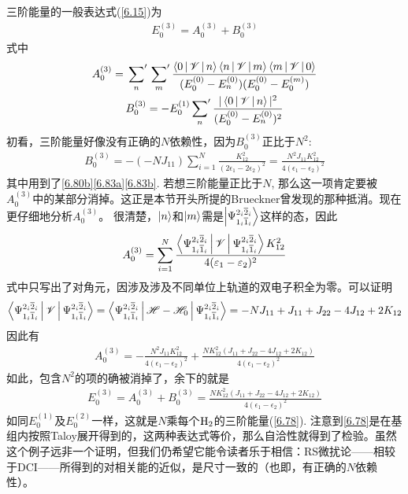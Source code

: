 三阶能量的一般表达式(\eqref{6.15})为
\begin{align}
E_0^{(3)} = A_0^{(3)} + B_{0}^{(3)}
\end{align}
式中
\begin{gather}
A_0^{(3)} = \sideset{}{'}\sum_n \sideset{}{'}\sum_m \frac{\Braket{0|\mathscr{V}|n}\Braket{n|\mathscr{V}|m}\Braket{m|\mathscr{V}|0}}{(E_0^{(0)} - E_n^{(0)}) (E_0^{(0)} - E_0^{(m)}) }\\
B_0^{(3)} = -E_0^{(1)}\sideset{}{'}{\sum}_n\frac{|\Braket{0|\mathscr{V}|n}|^2}{(E_0^{(0)} - E_n^{(0)})^2}
\end{gather}
初看，三阶能量好像没有正确的$N$依赖性，因为$B_0^{(3)}$正比于$N^2$:
\begin{align}
B_0^{(3)} = -(-NJ_{11}) \sum_{i=1}^{N} \frac{K_{12}^2}{(2\epsilon_1 - 2\epsilon_2)^2} = \frac{N^2J_{11}K_{12}^2}{4(\epsilon_1-\epsilon_2)^2}
\end{align}
其中用到了\eqref{6.80b}\eqref{6.83a}\eqref{6.83b}. 若想三阶能量正比于$N$, 那么这一项肯定要被$A_0^{(3)}$中的某部分消掉。这正是本节开头所提的Brueckner曾发现的那种抵消。现在更仔细地分析$A_0^{(3)}$。 很清楚，$\Ket{n}$和$\Ket{m}$需是$\Ket{\Psi_{1_i\overline{1}_i}^{2_i\overline{2}_i}}$这样的态，因此
\begin{align}
A_0^{(3)} = \sum_{i=1}^{N} \frac{\Braket{\Psi_{1_i\overline{1}_i}^{2_i\overline{2}_i}|\mathscr{V}|\Psi_{1_i\overline{1}_i}^{2_i\overline{2}_i}}K_{12}^2}{4(\varepsilon_1 - \varepsilon_2)^2}
\end{align}
式中只写出了对角元，因涉及涉及不同单位上轨道的双电子积全为零。可以证明
\begin{align}\Braket{\Psi_{1_i\overline{1}_i}^{2_i\overline{2}_i}|\mathscr{V}|\Psi_{1_i\overline{1}_i}^{2_i\overline{2}_i}} = \Braket{\Psi_{1_i\overline{1}_i}^{2_i\overline{2}_i}|\mathscr{H}-\mathscr{H}_0|\Psi_{1_i\overline{1}_i}^{2_i\overline{2}_i}}=-NJ_{11} + J_{11} + J_{22} - 4J_{12} + 2K_{12}
\label{6.90}
\end{align}
因此有
\begin{align}
A_0^{(3)} = - \frac{N^2J_{11}K_{12}^2}{4(\epsilon_1 - \epsilon_2)^2} + \frac{NK_{12}^2(J_{11} + J_{22} - 4J_{12} + 2K_{12})}{4(\epsilon_1 - \epsilon_2)^2}
\end{align}
如此，包含$N^2$的项的确被消掉了，余下的就是
\begin{align}
E_0^{(3)} = A_0^{(3)} + B_0^{(3)} = \frac{NK_{12}^2(J_{11} + J_{22} - 4J_{12} + 2K_{12})}{4(\epsilon_1 - \epsilon_2)^2}
\end{align}
如同$E_0^{(1)}$及$E_0^{(2)}$一样，这就是$N$乘每个$\mathrm{H}_2$的三阶能量(\eqref{6.78}). 注意到\eqref{6.78}是在基组内按照Taloy展开得到的，这两种表达式等价，那么自洽性就得到了检验。虽然这个例子远非一个证明，但我们仍希望它能令读者乐于相信：RS微扰论——相较于DCI——所得到的对相关能的近似，是尺寸一致的（也即，有正确的$N$依赖性）。
